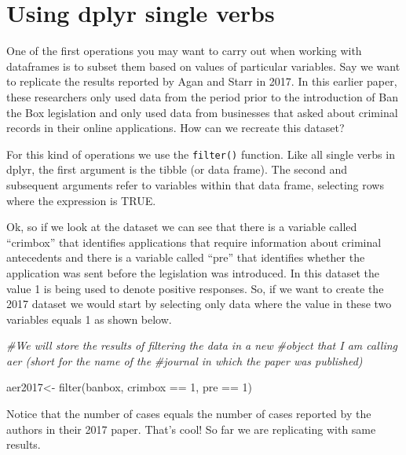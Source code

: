 \documentclass[
]{book}
\newenvironment{Shaded}{\begin{snugshade}}{\end{snugshade}}
\newcommand{\CommentTok}[1]{\textcolor[rgb]{0.56,0.35,0.01}{\textit{#1}}}
\newcommand{\DecValTok}[1]{\textcolor[rgb]{0.00,0.00,0.81}{#1}}
\newcommand{\FunctionTok}[1]{\textcolor[rgb]{0.00,0.00,0.00}{#1}}
\newcommand{\NormalTok}[1]{#1}
\newcommand{\OtherTok}[1]{\textcolor[rgb]{0.56,0.35,0.01}{#1}}
\newcommand{\SpecialCharTok}[1]{\textcolor[rgb]{0.00,0.00,0.00}{#1}}
\begin{document}
\hypertarget{using-dplyr-single-verbs}{%
\section{Using dplyr single verbs}\label{using-dplyr-single-verbs}}

One of the first operations you may want to carry out when working with dataframes is to subset them based on values of particular variables. Say we want to replicate the results reported by Agan and Starr in 2017. In this earlier paper, these researchers only used data from the period prior to the introduction of Ban the Box legislation and only used data from businesses that asked about criminal records in their online applications. How can we recreate this dataset?

For this kind of operations we use the \texttt{filter()} function. Like all single verbs in dplyr, the first argument is the tibble (or data frame). The second and subsequent arguments refer to variables within that data frame, selecting rows where the expression is TRUE.

Ok, so if we look at the dataset we can see that there is a variable called ``crimbox'' that identifies applications that require information about criminal antecedents and there is a variable called ``pre'' that identifies whether the application was sent before the legislation was introduced. In this dataset the value 1 is being used to denote positive responses. So, if we want to create the 2017 dataset we would start by selecting only data where the value in these two variables equals 1 as shown below.

\begin{Shaded}
\begin{Highlighting}[]
\CommentTok{\#We will store the results of filtering the data in a new }
\CommentTok{\#object that I am calling aer (short for the name of the }
\CommentTok{\#journal in which the paper was published)}

\NormalTok{aer2017}\OtherTok{\textless{}{-}} \FunctionTok{filter}\NormalTok{(banbox, crimbox }\SpecialCharTok{==} \DecValTok{1}\NormalTok{, pre }\SpecialCharTok{==} \DecValTok{1}\NormalTok{)}
\end{Highlighting}
\end{Shaded}

Notice that the number of cases equals the number of cases reported by the authors in their 2017 paper. That's cool! So far we are replicating with same results.
\end{document}
